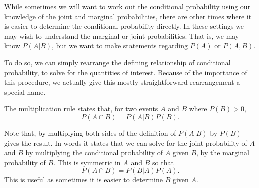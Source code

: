 \documentclass[
  letterpaper,
  DIV=11,
  numbers=noendperiod]{scrreprt}
\theoremstyle{definition}
\theoremstyle{definition}
\theoremstyle{definition}
\theoremstyle{remark}
\begin{document}
While sometimes we will want to work out the conditional probability
using our knowledge of the joint and marginal probabilities, there are
other times where it is easier to determine the conditional probability
directly. In these settings we may wish to understand the marginal or
joint probabilities. That is, we may know \(P(A|B)\), but we want to
make statements regarding \(P(A)\) or \(P(A,B)\).

To do so, we can simply rearrange the defining relationship of
conditional probability, to solve for the quantities of interest.
Because of the importance of this procedure, we actually give this
mostly straightforward rearrangement a special name.

\begin{tcolorbox}[enhanced jigsaw, coltitle=black, colframe=quarto-callout-tip-color-frame, colbacktitle=quarto-callout-tip-color!10!white, bottomrule=.15mm, opacitybacktitle=0.6, colback=white, toptitle=1mm, arc=.35mm, leftrule=.75mm, bottomtitle=1mm, opacityback=0, breakable, rightrule=.15mm, title={Multiplication Rule}, left=2mm, titlerule=0mm, toprule=.15mm]

The multiplication rule states that, for two events \(A\) and \(B\)
where \(P(B) > 0\), \[P(A\cap B) = P(A|B)P(B).\]

\end{tcolorbox}

Note that, by multiplying both sides of the definition of \(P(A|B)\) by
\(P(B)\) gives the result. In words it states that we can solve for the
joint probability of \(A\) and \(B\) by multiplying the conditional
probability of \(A\) given \(B\), by the marginal probability of \(B\).
This is symmetric in \(A\) and \(B\) so that
\[P(A\cap B) = P(B|A)P(A).\] This is useful as sometimes it is easier to
determine \(B\) given \(A\).
\end{document}
